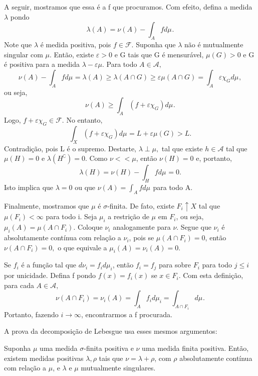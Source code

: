 \documentclass[measure_theory.tex]{subfiles}
\begin{document}
\begin{proof*}
	A seguir, mostramos que essa é a f que procuramos. Com efeito, defina a medida \(\lambda \) pondo
	\[
		\lambda (A) = \nu (A) - \int_{A}f d\mu_{}.
	\]
	Note que \(\lambda \) é medida positiva, pois \(f\in \mathcal{F}.\) Suponha que \(\lambda \) não é mutualmente singular com \(\mu \). Então, existe \(\varepsilon >0\) e G tais que G é mensurável, \(\mu (G) > 0\)
	e G é positiva para a medida \(\lambda -\varepsilon \mu .\) Para todo \(A\in \mathcal{A},\)
	\[
		\nu (A) - \int_{A}f d\mu_{} = \lambda (A) \geq \lambda (A\cap G) \geq \varepsilon \mu (A\cap G) = \int_{A}\varepsilon \chi_{G} d\mu_{},
	\]
	ou seja,
	\[
		\nu (A) \geq \int_{A}(f+\varepsilon \chi_{G}) d\mu_{}.
	\]
	Logo, \(f+\varepsilon \chi_{G}\in \mathcal{F}.\) No entanto,
	\[
		\int_{X}(f+\varepsilon \chi_{G}) d\mu_{} = L + \varepsilon \mu (G) > L.
	\]
	Contradição, pois L é o supremo. Destarte, \(\lambda \perp \mu ,\) tal que existe \(h\in \mathcal{A}\) tal que \(\mu (H) = 0\) e \(\lambda (H ^{\complement}) = 0\). Como \(\nu<<\mu \), então \(\nu (H) = 0\) e, portanto,
	\[
		\lambda (H) = \nu (H) - \int_{H}f d\mu_{} = 0.
	\]
	Isto implica que \(\lambda  = 0\) ou que \(\nu (A) = \int_{A}f d\mu_{}\) para todo A.

	Finalmente, mostramos que \(\mu \) é \(\sigma \)-finita. De fato, existe \(F_{i}\uparrow X\) tal que \(\mu (F_{i}) < \infty\) para todo i. Seja \(\mu_{i}\) a restrição de \(\mu \) em \(F_{i}\), ou seja, \(\mu_{i}(A) = \mu(A\cap F_{i})\).
	Coloque \(\nu_{i}\) analogamente para \(\nu \). Segue que \(\nu_{i}\) é absolutamente contínua com relação a \(\nu_{i}\), pois se \(\mu(A\cap F_{i}) = 0\), então \(\nu (A\cap F_{i})=0,\) o que equivale a \(\mu_{i}(A) = \nu_{i}(A) = 0.\)

	Se \(f_{i}\) é a função tal que \(d\nu_{i} = f_{i}d\mu_{i}\), então \(f_{i} = f_{j}\) para sobre \(F_{i}\) para todo \(j\leq i\) por unicidade. Defina f pondo \(f(x) = f_{i}(x)\) se \(x\in F_{i}.\) Com esta definição, para cada \(A\in \mathcal{A},\)
	\[
		\nu (A\cap F_{i}) = \nu_{i}(A) = \int_{A}f_{i} d\mu_{i} = \int_{A\cap F_{i}} d\mu_{}.
	\]
	Portanto, fazendo \(i\to \infty\), encontrarmos a f procurada. \qedsymbol
\end{proof*}
A prova da decomposição de Lebesgue usa esses mesmos argumentos:
\begin{theorem*}
	Suponha \(\mu \) uma medida \(\sigma \)-finita positiva e \(\nu \) uma medida finita positiva. Então, existem medidas positivas \(\lambda , \rho \) tais que \(\nu = \lambda + \rho \), com \(\rho \) absolutamente contínua com relação a \(\mu \), e \(\lambda \) e \(\mu \) mutualmente singulares.
\end{theorem*}
\end{document}
